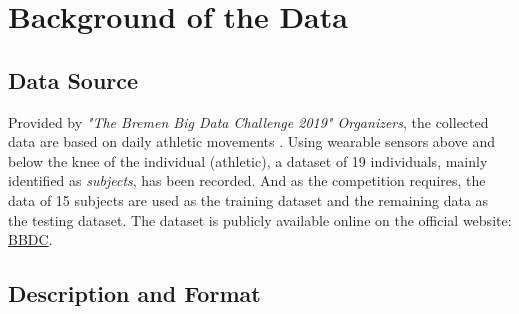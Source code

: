 %
%
%
%
%
%


\section{Background of the Data}
\subsection{Data Source}

Provided by \emph{"The Bremen Big Data Challenge 2019" Organizers}, the collected data are based on
daily athletic movements \parencite{bbdc}. Using wearable sensors above and below the knee of the individual (athletic),
a dataset of 19 individuals, mainly identified as \emph{subjects}, has been recorded. And as the
competition requires, the data of 15 subjects are used as the training dataset and the remaining data
as the testing dataset. The dataset is publicly available online on the official website:
\href{https://bbdc.csl.uni-bremen.de/images/2019/bbdc_2019_Bewegungsdaten_mit_referenz.zip}{BBDC}.

\subsection{Description and Format}

